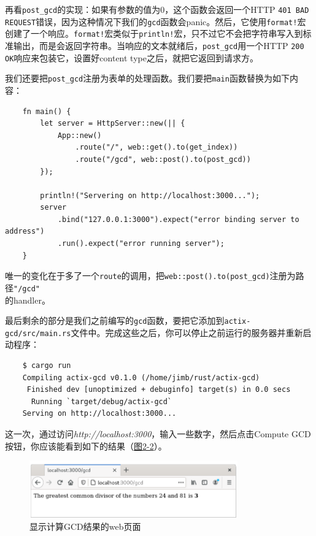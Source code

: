 再看\texttt{post\_gcd}的实现：如果有参数的值为0，这个函数会返回一个HTTP \texttt{401 BAD REQUEST}错误，因为这种情况下我们的\texttt{gcd}函数会panic。然后，它使用\texttt{format!}宏创建了一个响应。\texttt{format!}宏类似于\texttt{println!}宏，只不过它不会把字符串写入到标准输出，而是会返回字符串。当响应的文本就绪后，\texttt{post\_gcd}用一个HTTP \texttt{200 OK}响应来包装它，设置好content type之后，就把它返回到请求方。

我们还要把\texttt{post\_gcd}注册为表单的处理函数。我们要把\texttt{main}函数替换为如下内容：
\begin{verbatim}
    fn main() {
        let server = HttpServer::new(|| {
            App::new()
                .route("/", web::get().to(get_index))
                .route("/gcd", web::post().to(post_gcd))
        });

        println!("Servering on http://localhost:3000...");
        server
            .bind("127.0.0.1:3000").expect("error binding server to address")
            .run().expect("error running server");
    }
\end{verbatim}

唯一的变化在于多了一个\texttt{route}的调用，把\texttt{web::post().to(post\_gcd)}注册为路径\texttt{"/gcd"}\\
的handler。

最后剩余的部分是我们之前编写的\texttt{gcd}函数，要把它添加到\texttt{actix-gcd/src/main.rs}文件中。完成这些之后，你可以停止之前运行的服务器并重新启动程序：
\begin{verbatim}
    $ cargo run
    Compiling actix-gcd v0.1.0 (/home/jimb/rust/actix-gcd)
     Finished dev [unoptimized + debuginfo] target(s) in 0.0 secs
      Running `target/debug/actix-gcd`
    Serving on http://localhost:3000...
\end{verbatim}

这一次，通过访问\emph{http://localhost:3000}，输入一些数字，然后点击Compute GCD按钮，你应该能看到如下的结果（\hyperref[f2-2]{图2-2}）。
\begin{figure}[htbp]
    \centering
    \includegraphics[width=0.8\textwidth]{../img/f2-2.png}
    \caption{显示计算GCD结果的web页面}
    \label{f2-2}
\end{figure}

